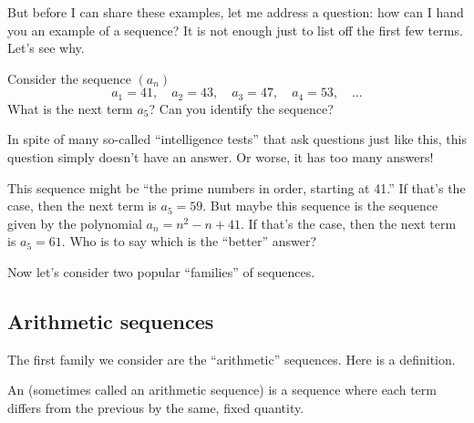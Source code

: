 But before I can share these examples, let me address a question: how
can I hand you an example of a sequence? It is not enough just to list
off the first few terms.  Let's see why.

\begin{example}
Consider the sequence $(a_n)$
$$
a_1 = 41, \quad a_2 = 43, \quad a_3 = 47, \quad a_4 = 53, \quad\ldots
$$
What is the next term $a_5$?  Can you identify the sequence?
\end{example}


\begin{solution}
  In spite of many so-called ``intelligence tests'' that ask questions
  just like this, this question simply doesn't have an answer.  Or
  worse, it has too many answers!

  This sequence might be ``the prime numbers in order, starting at
  41.''  If that's the case, then the next term is $a_5 =59$.  But
  maybe this sequence is the sequence given by the polynomial $a_n =
  n^2 - n + 41$.  If that's the case, then the next term is $a_5 =
  61$.  Who is to say which is the ``better'' answer?
\end{solution}


Now let's consider two popular ``families'' of sequences.

\subsection{Arithmetic sequences}

The first family we consider are the
``arithmetic'' sequences.  Here is a definition.

\begin{definition}
  An  (sometimes called an arithmetic
  sequence) is a sequence where each
  term differs from the previous by the same, fixed quantity.
\end{definition}

